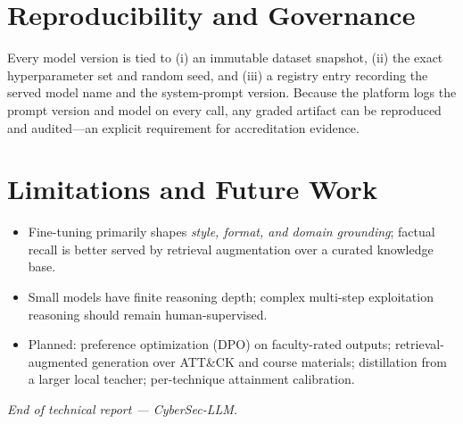 \documentclass[11pt,a4paper]{article}
\begin{document}
\section{Reproducibility and Governance}
Every model version is tied to (i) an immutable dataset snapshot, (ii) the exact
hyperparameter set and random seed, and (iii) a registry entry recording the
served model name and the system-prompt version. Because the platform logs the
prompt version and model on every call, any graded artifact can be reproduced
and audited---an explicit requirement for accreditation evidence.

\section{Limitations and Future Work}
\begin{itemize}[leftmargin=*]
  \item Fine-tuning primarily shapes \emph{style, format, and domain grounding};
        factual recall is better served by retrieval augmentation over a
        curated knowledge base.
  \item Small models have finite reasoning depth; complex multi-step
        exploitation reasoning should remain human-supervised.
  \item Planned: preference optimization (DPO) on faculty-rated outputs;
        retrieval-augmented generation over ATT\&CK and course materials;
        distillation from a larger local teacher; per-technique attainment
        calibration.
\end{itemize}

\vspace{0.8cm}
\begin{center}\small\itshape End of technical report --- CyberSec-LLM.\end{center}
\end{document}
